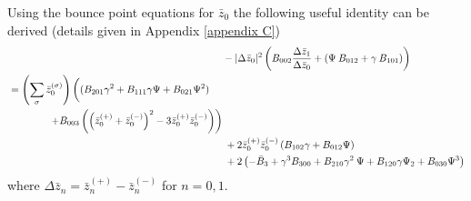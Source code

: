 \documentclass[aip,pop,reprint]{revtex4-1}
\newcommand*{\zb}{\bar{z}}
\newcommand*{\zbs}{\zb^{(\sigma)}}
\newcommand*{\zbp}{\zb^{(+)}}
\newcommand*{\zbm}{\zb^{(-)}}
\newcommand*{\Bb}{\bar{B}}
\newcommand*{\lbr}{\left(}
\newcommand*{\rbr}{\right)}
\begin{document}
Using the bounce point equations for $\zb_0$ the following useful identity can be derived (details given in Appendix \ref{appendix C})
\begin{align}
&-|\Delta \zb_0|^2\lbr B_{002}\frac{\Delta \zb_1}{\Delta \zb_0} +(\Psi\: B_{012}+\gamma\: B_{101})\rbr  \label{z1diff}  \\
\begin{split}
&=\lbr \sum_\sigma \zbs_0\rbr
\left(\vphantom{\lbr\zbp_0+\zbm_0\rbr^2} (B_{201}\gamma^2+B_{111}\gamma\Psi+B_{021}\Psi^2)  \right. \\
& \quad \left. \quad \quad \quad +B_{003}\lbr \lbr\zbp_0+\zbm_0\rbr^2-3 \zbp_0 \zbm_0\rbr \right)
 \end{split} \nonumber\\
&\:  +2 \zbp_0 \zbm_0 \lbr B_{102}\gamma +B_{012}\Psi \rbr \nonumber \\
&\:+ 2\lbr-\Bb_3 +\gamma^3 B_{300}+B_{210}\gamma^2\:\Psi +B_{120}\gamma \Psi_2 +B_{030}\Psi^3 \rbr\nonumber
\end{align}
where $\Delta \zb_n = \zbp_n -\zbm_n$ for $n=0,1.$
\end{document}
